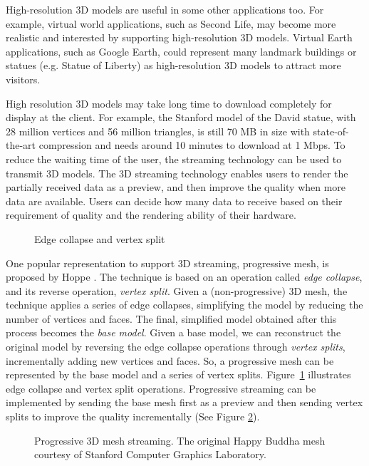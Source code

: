 \documentclass[11pt, a4paper]{report}
\begin{document}
    High-resolution 3D models are useful in some other applications too. 
    For example, virtual world applications,
    such as Second Life, may become more realistic and interested by
    supporting high-resolution 3D models. Virtual Earth applications, 
    such as Google Earth, could represent many landmark buildings or statues
    (e.g. Statue of Liberty) as high-resolution 3D models to attract
    more visitors.

    High resolution 3D models may take long time to download completely
    for display at the client. 
    For example, the Stanford model of the David statue, with 28 million vertices and
    56 million triangles, is still 70 MB in size with
    state-of-the-art compression \cite{alliez2001progressive} and needs around 10 minutes
    to download at 1 Mbps.  
    To reduce the waiting time of the user, 
    the streaming technology can be used to transmit 3D models. 
    The 3D streaming technology enables users to render the partially received data as a preview, 
    and then improve the quality when more data are available. 
    Users can decide how many data to receive based on their requirement of quality
    and the rendering ability of their hardware.

\begin{figure}[htbp!]
\centering
{}
\caption{Edge collapse and vertex split}\label{f:intro:split2}
\end{figure}
    One popular representation to support 3D streaming, progressive mesh, 
    is proposed by Hoppe \cite{hoppe96progressive}.
    The technique is based on an
    operation called \textit{edge collapse}, and its reverse
    operation, \textit{vertex split}.  Given a (non-progressive)
    3D mesh, the technique applies a series of edge collapses,
    simplifying the model by reducing the number of vertices and
    faces.  The final, simplified model obtained after this
    process becomes the \textit{base model}.  Given a base model,
    we can reconstruct the original model by reversing
    the edge collapse operations through \textit{vertex splits},
    incrementally adding new vertices and faces. So, a
    progressive mesh can be represented by the base
    model and a series of vertex splits.  
    Figure~\ref{f:intro:split2} illustrates edge
    collapse and vertex split operations.
    Progressive streaming can be implemented by sending the base mesh
    first as a preview and then sending vertex splits to improve 
    the quality incrementally (See Figure \ref{f:intro:progressive}).
    \begin{figure}[htbp!]
    \centering
    \caption{
    Progressive 3D mesh streaming. The original Happy Buddha mesh 
    courtesy of Stanford Computer Graphics Laboratory.
    \label{f:intro:progressive}}
    \end{figure}
    
\end{document}
